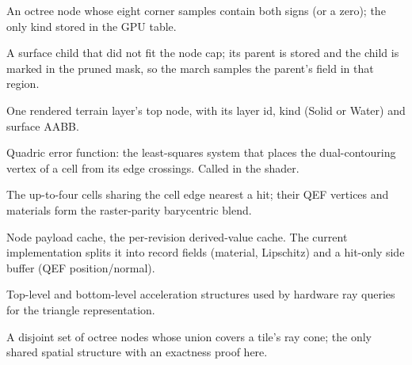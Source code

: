 \documentclass[11pt,a4paper]{article}
\newcommand{\code}[1]{\texttt{\detokenize{#1}}}
\theoremstyle{plain}
\theoremstyle{definition}
\theoremstyle{remark}
\begin{document}
\begin{description}[leftmargin=1.2em,itemsep=1pt]
\item[Surface node] An octree node whose eight corner samples contain both
  signs (or a zero); the only kind stored in the GPU table.
\item[Pruned child] A surface child that did not fit the node cap; its parent
  is stored and the child is marked in the pruned mask, so the march samples
  the parent's field in that region.
\item[Root] One rendered terrain layer's top node, with its layer id, kind
  (Solid or Water) and surface AABB.
\item[QEF] Quadric error function: the least-squares system that places the
  dual-contouring vertex of a cell from its edge crossings. Called
  \code{sdfCellPosition} in the shader.
\item[Ring cells] The up-to-four cells sharing the cell edge nearest a hit;
  their QEF vertices and materials form the raster-parity barycentric blend.
\item[NPC] Node payload cache, the per-revision derived-value cache. The
  current implementation splits it into record fields (material, Lipschitz)
  and a hit-only side buffer (QEF position/normal).
\item[TLAS/BLAS] Top-level and bottom-level acceleration structures used by
  hardware ray queries for the triangle representation.
\item[Closed cut] A disjoint set of octree nodes whose union covers a tile's
  ray cone; the only shared spatial structure with an exactness proof here.
\end{description}
\end{document}
